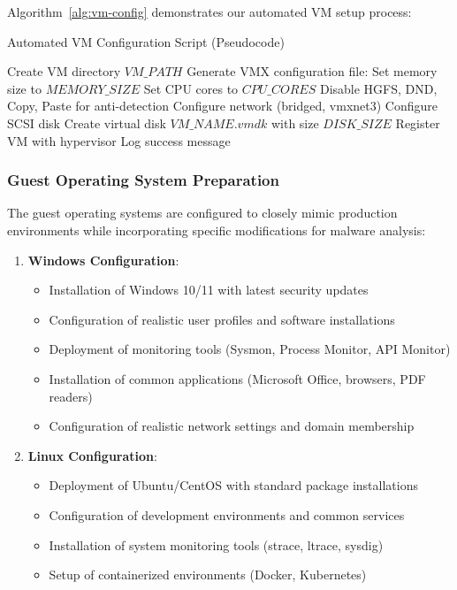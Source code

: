 Algorithm~\ref{alg:vm-config} demonstrates our automated VM setup process:

\begin{algorithm}[!htbp]
\caption{Automated VM Configuration Script (Pseudocode)}
\label{alg:vm-config}
\begin{algorithmic}[1]
    \State Create VM directory $VM\_PATH$
    \State Generate VMX configuration file:
    \State \quad Set memory size to $MEMORY\_SIZE$
    \State \quad Set CPU cores to $CPU\_CORES$
    \State \quad Disable HGFS, DND, Copy, Paste for anti-detection
    \State \quad Configure network (bridged, vmxnet3)
    \State \quad Configure SCSI disk
    \State Create virtual disk $VM\_NAME.vmdk$ with size $DISK\_SIZE$
    \State Register VM with hypervisor
    \State Log success message
\EndProcedure
\end{algorithmic}
\end{algorithm}

\subsubsection{Guest Operating System Preparation}

The guest operating systems are configured to closely mimic production environments while incorporating specific modifications for malware analysis:

\begin{enumerate}
    \item \textbf{Windows Configuration}:
    \begin{itemize}
        \item Installation of Windows 10/11 with latest security updates
        \item Configuration of realistic user profiles and software installations
        \item Deployment of monitoring tools (Sysmon, Process Monitor, API Monitor)
        \item Installation of common applications (Microsoft Office, browsers, PDF readers)
        \item Configuration of realistic network settings and domain membership
    \end{itemize}
    
    \item \textbf{Linux Configuration}:
    \begin{itemize}
        \item Deployment of Ubuntu/CentOS with standard package installations
        \item Configuration of development environments and common services
        \item Installation of system monitoring tools (strace, ltrace, sysdig)
        \item Setup of containerized environments (Docker, Kubernetes)
    \end{itemize}
\end{enumerate}

